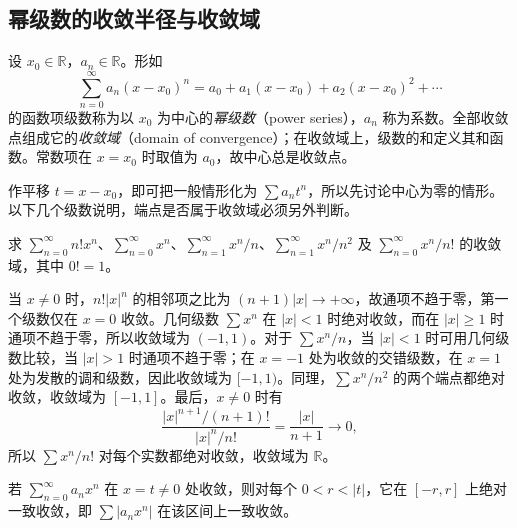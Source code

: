 \documentclass[UTF8,12pt,a4paper,fontset=fandol]{ctexbook}
\begin{document}
\subsection{幂级数的收敛半径与收敛域}
\label{subsec:radius-and-domain-of-convergence}

\begin{definition}
\label{def:real-power-series}
设 $x_0\in\mathbb R$，$a_n\in\mathbb R$。形如
\begin{equation}
    \sum_{n=0}^\infty a_n(x-x_0)^n
    =a_0+a_1(x-x_0)+a_2(x-x_0)^2+\cdots
    \label{eq:general-real-power-series}
\end{equation}
的函数项级数称为以 $x_0$ 为中心的\emph{幂级数}（power series），$a_n$ 称为系数。全部收敛点组成它的\emph{收敛域}（domain of convergence）；在收敛域上，级数的和定义其和函数。常数项在 $x=x_0$ 时取值为 $a_0$，故中心总是收敛点。
\end{definition}

作平移 $t=x-x_0$，即可把一般情形化为 $\sum a_nt^n$，所以先讨论中心为零的情形。以下几个级数说明，端点是否属于收敛域必须另外判断。

\begin{example}
\label{ex:power-series-basic-convergence-domains}
求 $\sum_{n=0}^\infty n!x^n$、$\sum_{n=0}^\infty x^n$、$\sum_{n=1}^\infty x^n/n$、$\sum_{n=1}^\infty x^n/n^2$ 及 $\sum_{n=0}^\infty x^n/n!$ 的收敛域，其中 $0!=1$。
\end{example}

\begin{solve}
当 $x\neq0$ 时，$n!|x|^n$ 的相邻项之比为 $(n+1)|x|\to+\infty$，故通项不趋于零，第一个级数仅在 $x=0$ 收敛。几何级数 $\sum x^n$ 在 $|x|<1$ 时绝对收敛，而在 $|x|\geq1$ 时通项不趋于零，所以收敛域为 $(-1,1)$。对于 $\sum x^n/n$，当 $|x|<1$ 时可用几何级数比较，当 $|x|>1$ 时通项不趋于零；在 $x=-1$ 处为收敛的交错级数，在 $x=1$ 处为发散的调和级数，因此收敛域为 $[-1,1)$。同理，$\sum x^n/n^2$ 的两个端点都绝对收敛，收敛域为 $[-1,1]$。最后，$x\neq0$ 时有
\[
    \frac{|x|^{n+1}/(n+1)!}{|x|^n/n!}
    =\frac{|x|}{n+1}\longrightarrow0,
\]
所以 $\sum x^n/n!$ 对每个实数都绝对收敛，收敛域为 $\mathbb R$。
\end{solve}

\begin{theorem}[由一个收敛点控制内部区间]
\label{thm:power-series-interior-absolute-uniform-convergence}
若 $\sum_{n=0}^\infty a_nx^n$ 在 $x=t\neq0$ 处收敛，则对每个 $0<r<|t|$，它在 $[-r,r]$ 上绝对一致收敛，即 $\sum |a_nx^n|$ 在该区间上一致收敛。
\end{theorem}
\end{document}
